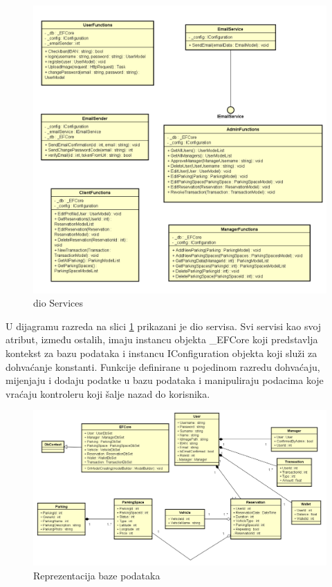 			
			\begin{figure}[h]
				\centering
				\includegraphics[width=\textwidth,keepaspectratio]{slike/progi3_1.png}
				\caption{dio Services}
				\label{fig:services}
			\end{figure}
			
			{U dijagramu razreda na slici \ref{fig:services} prikazani je dio servisa. Svi servisi kao svoj atribut, između ostalih, imaju instancu objekta \_EFCore koji predstavlja kontekst za bazu podataka i instancu IConfiguration objekta koji služi za dohvaćanje konstanti. Funkcije definirane u pojedinom razredu dohvaćaju, mijenjaju i dodaju podatke u bazu podataka i manipuliraju podacima koje vraćaju kontroleru koji šalje nazad do korisnika.}
			
			\begin{figure}[h]
				\centering
				\includegraphics[width=\textwidth,keepaspectratio]{slike/progi2_1.png}
				\caption{Reprezentacija baze podataka}
				\label{fig:repr}
			\end{figure}
			
